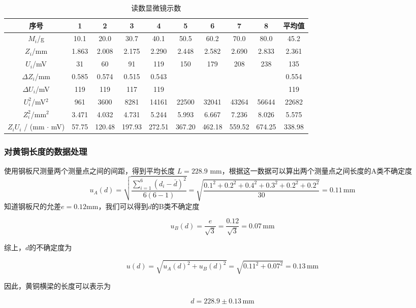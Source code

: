 \documentclass[zihao=5, UTF8]{article}
\theoremstyle{MyLineTheoremStyle} %
\theoremstyle{MyBlockTheoremStyle} %
\theoremstyle{MySubsubsectionStyle} %
\begin{document}
\begin{table}[h]
    \centering
    \begin{tabular}{|c|c|c|c|c|c|c|c|c|c|}
        \hline
        序号 & 1 & 2 & 3 & 4 & 5 & 6 & 7 & 8 & 平均值 \\ \hline
        $M_i$/g & 10.1 & 20.0 & 30.7 & 40.1 & 50.5 & 60.2 & 70.0 & 80.0 & 45.2 \\ \hline
        $Z_i$/mm & 1.863 & 2.008 & 2.175 & 2.290 & 2.448 & 2.582 & 2.690 & 2.833 & 2.361 \\ \hline
        $U_i$/mV & 31 & 60 & 91 & 119 & 150 & 179 & 208 & 238 & 135 \\ \hline
        $\Delta Z_i$/mm & 0.585 & 0.574 & 0.515 & 0.543 &  &  &  &  & 0.554 \\ \hline
        $\Delta U_i$/mV & 119 & 119 & 117 & 119 &  &  &  &  & 119 \\ \hline
        $U_i^2$/mV$^2$ & 961 & 3600 & 8281 & 14161 & 22500 & 32041 & 43264 & 56644 & 22682 \\ \hline
        $Z_i^2$/mm$^2$ & 3.471 & 4.032 & 4.731 & 5.244 & 5.993 & 6.667 & 7.236 & 8.026 & 5.575 \\ \hline
        $Z_i U_i$ / (mm $\cdot$ mV) & 57.75 & 120.48 & 197.93 & 272.51 & 367.20 & 462.18 & 559.52 & 674.25 & 338.98 \\ \hline
    \end{tabular}
    \caption{读数显微镜示数}
\end{table}

\subsubsection{对黄铜长度的数据处理}

使用钢板尺测量两个测量点之间的间距，得到平均长度 $L = 228.9$ mm，根据这一数据可以算出两个测量点之间长度的A类不确定度
\[
u_A (d) = \sqrt{\frac{\sum_{i=1}^{6} (d_i - \bar{d})^2}{6(6-1)}} = \sqrt{\frac{0.1^2 + 0.2^2 + 0.4^2 + 0.3^2 + 0.2^2 + 0.2^2}{30}} = 0.11 \, \text{mm}
\]
知道钢板尺的允差$e = 0.12$mm，我们可以得到$d$的B类不确定度

\[ u_B(d) = \frac{e}{\sqrt{3}} = \frac{0.12}{\sqrt{3}} = 0.07 \, \text{mm} \]

综上，$d$的不确定度为

\[ u(d) = \sqrt{u_A(d)^2 + u_B(d)^2} = \sqrt{0.11^2 + 0.07^2} = 0.13 \, \text{mm} \]

因此，黄铜横梁的长度可以表示为

\[ d = 228.9 \pm 0.13 \, \text{mm} \]
\end{document}
